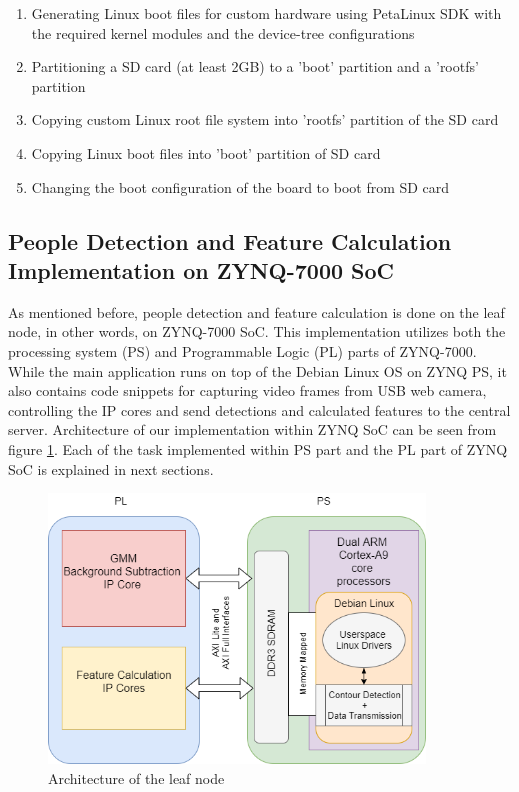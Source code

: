 \documentclass[12pt,a4paper]{report}
\begin{document}
\begin{enumerate}
\item Generating Linux boot files for custom hardware using PetaLinux SDK with the required kernel modules and the device-tree configurations
\item Partitioning a SD card (at least 2GB) to a 'boot' partition and a 'rootfs' partition
\item Copying custom Linux root file system into 'rootfs' partition of the SD card
\item Copying Linux boot files into 'boot' partition of SD card
\item Changing the boot configuration of the board to boot from SD card
\end{enumerate}

\subsection{People Detection and Feature Calculation Implementation on ZYNQ-7000 SoC}
As mentioned before, people detection and feature calculation is done on the leaf node, in other words, on ZYNQ-7000 SoC. This implementation utilizes both the processing system (PS) and Programmable Logic (PL) parts of ZYNQ-7000. While the main application runs on top of the Debian Linux OS on ZYNQ PS, it also contains code snippets for capturing video frames from USB web camera, controlling the IP cores and send detections and calculated features to the central server. Architecture of our implementation within ZYNQ SoC can be seen from figure \ref{leafnode_Archi}. Each of the task implemented within PS part and the PL part of ZYNQ SoC is explained in next sections.

\begin{figure}[H]
\includegraphics[width=10cm]{hardware.png}
\centering
\caption{Architecture of the leaf node}
\label{leafnode_Archi}
\end{figure}
\end{document}
